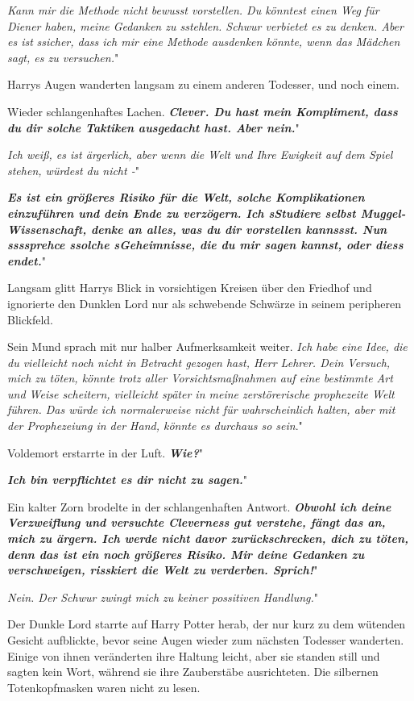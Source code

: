 \glqq{}\emph{Kann mir die Methode nicht bewusst vorstellen. Du könntest einen Weg
für Diener haben, meine Gedanken zu sstehlen. Schwur verbietet es zu denken.
Aber es ist} \emph{ssicher, dass ich mir eine Methode ausdenken könnte, wenn das
Mädchen sagt, es zu versuchen.}"

Harrys Augen wanderten langsam zu einem anderen Todesser, und noch einem.

Wieder schlangenhaftes Lachen. \glqq{}\textbf{\emph{Clever. Du hast mein
Kompliment, dass du dir solche Taktiken ausgedacht hast. Aber nein.}}"

\glqq{}\emph{Ich weiß, es ist ärgerlich, aber wenn die Welt und Ihre Ewigkeit auf
dem Spiel stehen, würdest du nicht -}"

\glqq{}\textbf{\emph{Es ist ein größeres Risiko für die Welt, solche
Komplikationen einzuführen und dein Ende zu verzögern. Ich sStudiere selbst
Muggel-Wissenschaft, denke an alles, was du dir vorstellen kannssst. Nun
ssssprehce ssolche sGeheimnisse, die du mir sagen kannst, oder diess endet.}}"

Langsam glitt Harrys Blick in vorsichtigen Kreisen über den Friedhof und
ignorierte den Dunklen Lord nur als schwebende Schwärze in seinem peripheren
Blickfeld.

Sein Mund sprach mit nur halber Aufmerksamkeit weiter. \glqq{}\emph{Ich habe eine
Idee, die du vielleicht noch nicht in Betracht gezogen hast, Herr Lehrer. Dein
Versuch, mich zu töten, könnte trotz aller Vorsichtsmaßnahmen auf eine bestimmte
Art und Weise scheitern, vielleicht später in meine zerstörerische prophezeite
Welt führen. Das würde ich normalerweise nicht für wahrscheinlich halten, aber
mit der Prophezeiung in der Hand, könnte es durchaus so sein}."

Voldemort erstarrte in der Luft. \glqq{}\textbf{\emph{Wie?}}"

\glqq{}\textbf{\emph{Ich bin verpflichtet es dir nicht zu sagen.}}"

Ein kalter Zorn brodelte in der schlangenhaften Antwort. \glqq{}
\textbf{\emph{Obwohl ich deine Verzweiflung und versuchte Cleverness gut
verstehe, fängt das an, mich zu ärgern. Ich werde nicht davor zurückschrecken,
dich zu töten, denn das ist ein noch größeres Risiko. Mir deine Gedanken zu
verschweigen, risskiert die Welt zu verderben. Sprich!}}"

\glqq{}\emph{Nein. Der Schwur zwingt mich zu keiner possitiven Handlung.}"

Der Dunkle Lord starrte auf Harry Potter herab, der nur kurz zu dem wütenden
Gesicht aufblickte, bevor seine Augen wieder zum nächsten Todesser wanderten.
Einige von ihnen veränderten ihre Haltung leicht, aber sie standen still und
sagten kein Wort, während sie ihre Zauberstäbe ausrichteten. Die silbernen
Totenkopfmasken waren nicht zu lesen.

